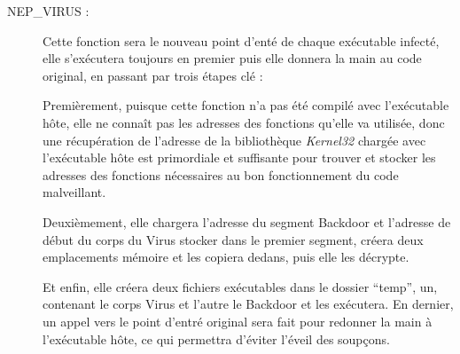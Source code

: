 \begin{description}
        \item[NEP\_VIRUS :] Cette fonction sera le nouveau point d’enté de chaque exécutable infecté, elle s'exécutera 
            toujours en premier puis elle donnera la main au code original, en passant par trois étapes clé :

            Premièrement, puisque cette fonction n'a pas été compilé avec l’exécutable hôte, elle ne connaît pas les 
            adresses des fonctions qu'elle va utilisée, donc une récupération de l’adresse de la bibliothèque 
            \emph{Kernel32} chargée avec l’exécutable hôte est primordiale et suffisante pour trouver et stocker les
            adresses des fonctions nécessaires au bon fonctionnement du code malveillant.

            Deuxièmement, elle chargera l’adresse du segment  Backdoor et l'adresse de début du corps du Virus stocker 
            dans le premier segment, créera deux emplacements mémoire et les copiera dedans, puis elle les décrypte.

            Et enfin, elle créera deux fichiers exécutables dans le dossier ``temp'', un, contenant le corps Virus et 
            l’autre le Backdoor et les exécutera. En dernier, un appel vers le point d’entré original sera fait
            pour redonner la main à l'exécutable hôte, ce qui permettra d'éviter l'éveil des soupçons.
    \end{description}

\newpage

